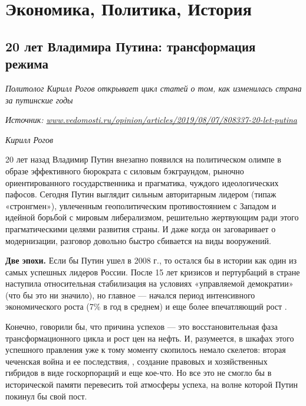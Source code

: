 \chapter{Экономика, Политика, История}


\section{20 лет Владимира Путина: трансформация режима}

\textit{Политолог Кирилл Рогов открывает цикл статей о том, как изменилась страна за путинские годы}

\textit{Источник: \url{www.vedomosti.ru/opinion/articles/2019/08/07/808337-20-let-putina}}

\textit{Кирилл Рогов }

20 лет назад Владимир Путин внезапно появился
на политическом олимпе в образе эффективного
бюрократа с силовым бэкграундом, рыночно ориентированного
государственника и прагматика, чуждого идеологических пафосов.
Сегодня Путин выглядит сильным авторитарным лидером
(типаж «стронгмен»), увлеченным геополитическим противостоянием с
Западом и идейной борьбой с мировым либерализмом, решительно
жертвующим ради этого прагматическими целями развития страны.
И даже когда он заговаривает о модернизации, разговор довольно
быстро сбивается на виды вооружений.

\textbf{Две эпохи.}
Если бы Путин ушел в 2008 г., то остался бы в истории как один из самых успешных лидеров России. После 15 лет кризисов и пертурбаций в стране наступила относительная стабилизация на условиях «управляемой демократии» (что бы это ни значило), но главное --- начался период интенсивного экономического роста (7\% в год в среднем) и еще более впечатляющий рост .

Конечно,  говорили бы, что причина успехов --- это восстановительная фаза трансформационного цикла и рост цен на нефть. И, разумеется, в шкафах этого успешного правления уже к тому моменту скопилось немало скелетов: вторая чеченская война и ее последствия, , создание правовых и хозяйственных гибридов в виде госкорпораций и еще кое-что. Но все это не смогло бы в исторической памяти перевесить той атмосферы успеха, на волне которой Путин покинул бы свой пост.

